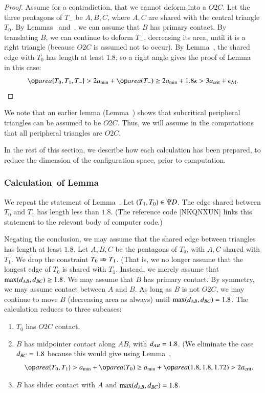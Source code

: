 \begin{proof} 
  Assume for a contradiction, that we cannot deform into a $O2C$.  Let
  the three pentagons of $T_-$ be $A,B,C$, where $A,C$ are shared with
  the central triangle $T_0$.  By Lemmas~
  and~, we can assume that $B$ has primary
  contact.  By translating $B$, we can continue to deform $T_-$,
  decreasing its area, until it is a right triangle (because $O2C$ is
  assumed not to occur).  By Lemma~, the shared edge
  with $T_0$ has length at least $1.8$, so a right angle gives the
  proof of Lemma~ in this case:
\[
\area\{T_0,T_1,T_-\} > 2\ao + \area(T_-) 
\ge 2\ao + 1.8\kappa > 3\acrit + \epsM.
\]
\end{proof}


We note that an earlier lemma (Lemma~) shows that
subcritical peripheral triangles can be assumed to be $O2C$. Thus, we
will assume in the computations that all peripheral triangles are
$O2C$.

In the rest of this section, we describe how each calculation has been
prepared, to reduce the dimension of the configuration space, prior to
computation.

\subsubsection{Calculation~of Lemma~} \label{sec:pseudo1}

We repeat the statement of Lemma~.  Let
$(T_1,T_0)\in \Psi D$.  The edge shared between $T_0$ and $T_1$ has
length less than $1.8$.  (The reference code [NKQNXUN] links this
statement to the relevant body of computer code.)

Negating the conclusion, we may assume that the shared edge between
triangles has length at least $1.8$.  Let $A,B,C$ be the pentagons of
$T_0$, with $A,C$ shared with $T_1$.  We drop the constraint $T_0\nRightarrow
T_1$.  (That is, we no longer assume that the longest edge of $T_0$ is
shared with $T_1$.  Instead, we merely assume that
$\max(d_{AB},d_{BC})\ge 1.8$.  We may assume that $B$ has primary
contact. By symmetry, we may assume contact between $A$ and $B$.  As
long as $B$ is not $O2C$, we may continue to move $B$ (decreasing area
as always) until $\max(d_{AB},d_{BC})=1.8$.  The calculation reduces
to three subcases:
\begin{enumerate}
\item $T_0$ has $O2C$ contact.
\item $B$ has midpointer contact along $AB$, with $d_{AB}=1.8$.  (We
  eliminate the case $d_{BC}=1.8$ because this would give using
  Lemma~,
\[
\area\{T_0,T_1\} > \ao + \area(T_0) \ge \ao + \area(1.8,1.8,1.72) > 2\acrit.
\]
\item $B$ has slider contact with $A$ and $\max(d_{AB},d_{BC})=1.8$.
\end{enumerate}

